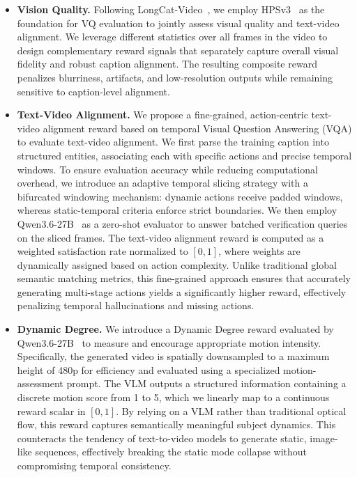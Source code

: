 \begin{itemize}
    \item \textbf{Vision Quality.} Following LongCat-Video~\cite{longcatvideo}, we employ HPSv3~\cite{ma2025hpsv3} as the foundation for VQ evaluation to jointly assess visual quality and text-video alignment. We leverage different statistics over all frames in the video to design complementary reward signals that separately capture overall visual fidelity and robust caption alignment. The resulting composite reward penalizes blurriness, artifacts, and low-resolution outputs while remaining sensitive to caption-level alignment.
    
    \item \textbf{Text-Video Alignment.} 
    We propose a fine-grained, action-centric text-video alignment reward based on temporal Visual Question Answering (VQA) to evaluate text-video alignment. 
    We first parse the training caption into structured entities, associating each with specific actions and precise temporal windows. To ensure evaluation accuracy while reducing computational overhead, we introduce an adaptive temporal slicing strategy with a bifurcated windowing mechanism: dynamic actions receive padded windows, whereas static-temporal criteria enforce strict boundaries. We then employ Qwen3.6-27B~\cite{qwen3.6-27b} as a zero-shot evaluator to answer batched verification queries on the sliced frames. 
    The text-video alignment reward is computed as a weighted satisfaction rate normalized to $[0, 1]$, where weights are dynamically assigned based on action complexity. 
    Unlike traditional global semantic matching metrics, this fine-grained approach ensures that accurately generating multi-stage actions yields a significantly higher reward, effectively penalizing temporal hallucinations and missing actions.

    \item \textbf{Dynamic Degree.} 
    We introduce a Dynamic Degree reward evaluated by Qwen3.6-27B~\cite{qwen3.6-27b} to measure and encourage appropriate motion intensity. 
    Specifically, the generated video is spatially downsampled to a maximum height of 480p for efficiency and evaluated using a specialized motion-assessment prompt. 
    The VLM outputs a structured information containing a discrete motion score from 1 to 5, which we linearly map to a continuous reward scalar in $[0, 1]$. 
    By relying on a VLM rather than traditional optical flow, this reward captures semantically meaningful subject dynamics. This counteracts the tendency of text-to-video models to generate static, image-like sequences, effectively breaking the static mode collapse without compromising temporal consistency.


\end{itemize}
